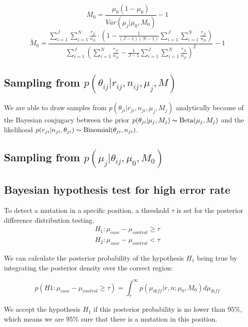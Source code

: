 \documentclass[11pt,reqno]{amsart}
\begin{document}
\begin{equation}
 M_0=\frac{\mu_0(1-\mu_0)}{Var(\mu_j|\mu_0,M_0)}-1
\end{equation}
\begin{equation}
 \tilde{M}_0 = \frac{\sum_{i=1}^J\sum_{i=1}^N\frac{r_{ji}}{n_{ji}}\cdot\left(1-\frac{1}{(J-1)(N-1)}\sum_{i=1}^J\sum_{i=1}^N\frac{r_{ji}}{n_{ji}}\right)}{\sum_{i=1}^J\left(\sum_{i=1}^N\frac{r_{ji}}{n_{ji}}-\frac{1}{J-1}\sum_{i=1}^J\sum_{i=1}^N\frac{r_{ji}}{n_{ji}}\right)^2}-1
\end{equation}

\subsection{Sampling from $p \left( \theta_{ij} |r_{ij},n_{ij},\mu_j,M \right)$}

We are able to draw samples from $p(\theta_{ji} | r_{ji}, n_{ji}, \mu_j, M_j)$ analytically because of the Bayesian conjugacy between the prior $p(\theta_{ji} | \mu_j, M_j) \thicksim \text{Beta}(\mu_j, M_j)$ and the likelihood $p(r_{ji} | n_{ji}, \theta_{ji}) \thicksim \text{Binomial}(\theta_{ji}, n_{ji})$. 


\subsection{Sampling from $p \left( \mu_j |\theta_{ij},\mu_0,M_0\right)$}

\subsection{Bayesian hypothesis test for high error rate}

To detect a mutation in a specific position, a threshold $\tau$ is set for the posterior difference distribution testing.
\begin{align}
 H_1: \mu_{case}-\mu_{control}\geq\tau \\
 H_2: \mu_{case}-\mu_{control}<\tau
\end{align}

We can calculate the posterior probability of the hypothesis $H_1$ being true by integrating the posterior density over the correct region:

\begin{equation}
 p(H1:\mu_{case}-\mu_{control}\geq\tau)=\int_\tau^\infty p(\mu_{diff} |r,n; \mu_0,M_0)d\mu_{diff}
\end{equation}

We accept the hypothesis $H_1$ if this posterior probability is no lower than 95\%, which means we are 95\% sure that there is a mutation in this position.
\end{document}
